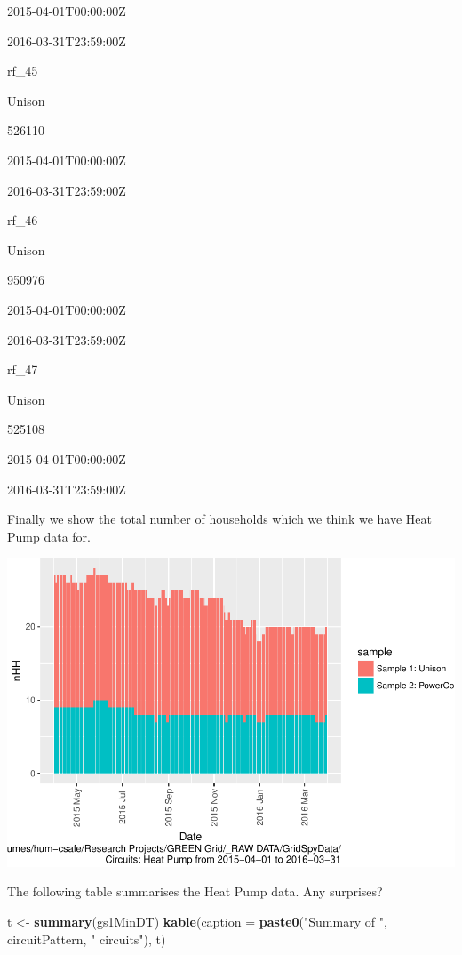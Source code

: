 \documentclass[]{article}
\newenvironment{Shaded}{\begin{snugshade}}{\end{snugshade}}
\newcommand{\KeywordTok}[1]{\textcolor[rgb]{0.13,0.29,0.53}{\textbf{#1}}}
\newcommand{\DataTypeTok}[1]{\textcolor[rgb]{0.13,0.29,0.53}{#1}}
\newcommand{\StringTok}[1]{\textcolor[rgb]{0.31,0.60,0.02}{#1}}
\newcommand{\NormalTok}[1]{#1}
\begin{document}
2015-04-01T00:00:00Z

2016-03-31T23:59:00Z

rf\_45

Unison

526110

2015-04-01T00:00:00Z

2016-03-31T23:59:00Z

rf\_46

Unison

950976

2015-04-01T00:00:00Z

2016-03-31T23:59:00Z

rf\_47

Unison

525108

2015-04-01T00:00:00Z

2016-03-31T23:59:00Z

Finally we show the total number of households which we think we have
Heat Pump data for.

\includegraphics{ggProfile_Heat Pump_2015-04-01_2016-03-31_files/figure-latex/liveDataHouseholds-1.pdf}

The following table summarises the Heat Pump data. Any surprises?

\begin{Shaded}
\begin{Highlighting}[]
\NormalTok{t <-}\StringTok{ }\KeywordTok{summary}\NormalTok{(gs1MinDT)}
\KeywordTok{kable}\NormalTok{(}\DataTypeTok{caption =} \KeywordTok{paste0}\NormalTok{(}\StringTok{"Summary of "}\NormalTok{, circuitPattern, }\StringTok{" circuits"}\NormalTok{), t)}
\end{Highlighting}
\end{Shaded}
\end{document}
